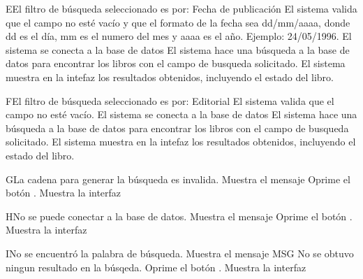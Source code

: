 		\begin{UCtrayectoriaA}{E}{El filtro de búsqueda seleccionado es por: Fecha de publicación}
			\UCpaso[\UCsist] El sistema valida que el campo no esté vacío y que el formato de la fecha sea dd/mm/aaaa, donde dd es el día, mm es el numero del mes y aaaa es el año. Ejemplo: 24/05/1996. 
			\UCpaso[\UCsist] El sistema se conecta a la base de datos 
			\UCpaso[\UCsist] El sistema hace una búsqueda a la base de datos para encontrar los libros con el campo de busqueda solicitado. 
			\UCpaso[\UCsist] El sistema muestra en la intefaz  los resultados obtenidos, incluyendo el estado del libro.
		\end{UCtrayectoriaA}

		\begin{UCtrayectoriaA}{F}{El filtro de búsqueda seleccionado es por: Editorial}
			\UCpaso[\UCsist] El sistema valida que el campo no esté vacío. 
			\UCpaso[\UCsist] El sistema se conecta a la base de datos 
			\UCpaso[\UCsist] El sistema hace una búsqueda a la base de datos para encontrar los libros con el campo de busqueda solicitado. 
			\UCpaso[\UCsist] El sistema muestra en la intefaz  los resultados obtenidos, incluyendo el estado del libro.
		\end{UCtrayectoriaA}

		\begin{UCtrayectoriaA}{G}{La cadena para generar la búsqueda es invalida.}
			\UCpaso[\UCsist] Muestra el mensaje  
			\UCpaso[\UCactor] Oprime el botón .
			\UCpaso[\UCsist] Muestra la interfaz 
		\end{UCtrayectoriaA}

		\begin{UCtrayectoriaA}{H}{No se puede conectar a la base de datos.}
			\UCpaso[\UCsist] Muestra el mensaje  
			\UCpaso[\UCactor] Oprime el botón .
			\UCpaso[\UCsist] Muestra la interfaz 
		\end{UCtrayectoriaA}

		\begin{UCtrayectoriaA}{I}{No se encuentró la palabra de búsqueda.}
			\UCpaso[\UCsist] Muestra el mensaje MSG No se obtuvo ningun resultado en la búsqeda.
			\UCpaso[\UCactor] Oprime el botón .
			\UCpaso[\UCsist] Muestra la interfaz 
		\end{UCtrayectoriaA}
		
